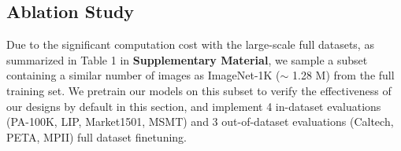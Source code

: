 \documentclass[10pt,twocolumn,letterpaper]{article}
\begin{document}
\begin{table}[t]
 \footnotesize
  \centering
  \caption{Ablation results.  "A", "S", and "T" respectively denote all shared, specific, and task-shared projector. $\dag$ indicates the results are reported as 1-heavy occluded MR$^{-2}$ for averaging.}
    \vspace{-2em}
  \label{tab_ablation}\end{table} 
\subsection{Ablation Study} \label{sec:ablation}
 Due to the significant computation cost with the large-scale full datasets, as summarized in Table 1 in \textbf{Supplementary Material}, we sample a subset containing a similar number of images as ImageNet-1K ($\sim$ 1.28 M) from the full training set. We pretrain our models on this subset to verify the effectiveness of our designs by default in this section, and implement 4 in-dataset evaluations (PA-100K, LIP, Market1501, MSMT) and 3 out-of-dataset evaluations (Caltech, PETA, MPII) full dataset finetuning.
\end{document}
